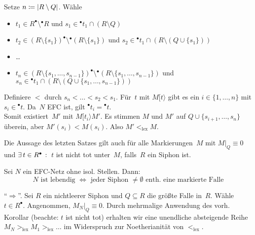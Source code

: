 \documentclass{cheat-sheet}
\newcommand{\preset}[1]{{}^\bullet{#1}} %
\newcommand{\postset}[1]{{#1}^\bullet} %
\newcommand{\activeTransition}[1]{[{#1}\rangle} %
\begin{document}
\begin{beweis}
  Setze $n \coloneqq \lvert R \setminus Q\rvert$.
  Wähle
  \begin{itemize}
    \item $t_1 \in \postset{R} \setminus \preset{R}$ und $s_1 \in \preset{t_1} \cap (R \setminus Q)$
    \item $t_2 \in \postset{(R \setminus \{ s_1 \})} \setminus \preset{(R \setminus \{ s_1 \})}$ und $s_2 \in \preset{t_1} \cap (R \setminus (Q \cup \{ s_1 \}))$
    \item \ldots
    \item $t_n \in \postset{(R \setminus \{ s_1, \ldots, s_{n-1} \})} \setminus \preset{(R \setminus \{ s_1, \ldots, s_{n-1} \})}$ und $s_n \in \preset{t_1} \cap (R \setminus (Q \cup \{ s_1, \ldots, s_{n-1} \}))$
  \end{itemize}
  Definiere ${<}$ durch $s_n < \ldots < s_2 < s_1$.
  Für~$t$ mit $M \activeTransition{t}$ gibt es ein $i \in \{ 1, \ldots, n \}$ mit $s_i \in \preset{t}$.
  Da~$N$ EFC ist, gilt $\preset{t_i} = \preset{t}$. \\
  Somit existiert~$M'$ mit $M \activeTransition{t_i} M'$.
  Es stimmen $M$ und $M'$ auf $Q \cup \{ s_{i+1}, \ldots, s_n \}$ überein, aber $M'(s_i) < M(s_i)$.
  Also $M' <_\mathrm{lex} M$.
\end{beweis}

\begin{kor}
  Die Aussage des letzten Satzes gilt auch für alle Markierungen~$M$ mit $M|_Q \equiv 0$ und $\ex{t \in \postset{R}}$ $t$ ist nicht tot unter~$M$, falls~$R$ ein Siphon ist.
\end{kor}

\begin{satz}
  Sei $N$ ein EFC-Netz ohne isol. Stellen.
  Dann:
  \[
    \text{$N$ ist lebendig $\iff$ jeder Siphon $\neq \emptyset$ enth. eine markierte Falle}
  \]
\end{satz}

\begin{beweis}
  "`$\Rightarrow$"'.
  Sei $R$ ein nichtleerer Siphon und $Q \subseteq R$ die größte Falle in~$R$.
  Wähle $t \in \postset{R}$.
  Angenommen, $M_N|_Q \equiv 0$.
  Durch mehrmalige Anwendung des vorh. Korollar (beachte: $t$ ist nicht tot) erhalten wir eine unendliche absteigende Reihe $M_N >_\mathrm{lex} M_1 >_\mathrm{lex} \ldots$ im Widerspruch zur Noetherianität von ${<_\mathrm{lex}}$.
\end{beweis}

\end{document}
